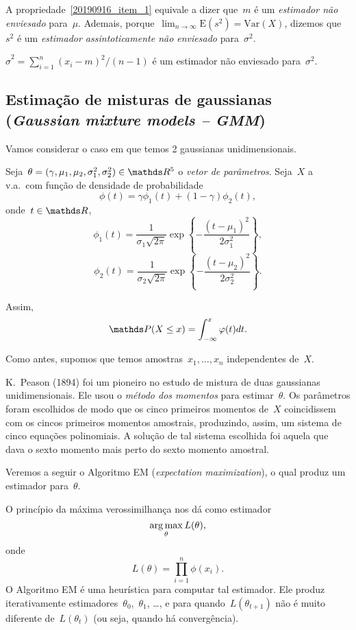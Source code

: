   A propriedade~\ref{20190916_item_1} equivale a dizer que~$m$ é um \emph{estimador não enviesado} para~$\mu$.
  Ademais, porque~$\lim_{n \to \infty}{\mathrm{E}(s^2)}
  =\mathrm{Var}(X)$, dizemos que~$s^2$ é um
  \emph{estimador assintoticamente não enviesado} para~$\sigma^2$.
  
  \begin{observacao}
   $\hat{\sigma}^2
   =\sum_{i=1}^{n}(x_i - m)^2/(n-1)$ é um estimador não enviesado
   para~$\sigma^2$.
  \end{observacao}
  
\subsection{Estimação de misturas de gaussianas
(\emph{Gaussian mixture models -- GMM})}

 Vamos considerar o caso em que temos 2 gaussianas unidimensionais.
 
 Seja~$\theta = (\gamma, \mu_1, \mu_2, \sigma^2_1, \sigma^2_2) \in \RR^5$
 o \emph{vetor de parâmetros}.
 Seja~$X$ a v.a.\ com função de densidade de probabilidade
 $$\phi(t) = \gamma \phi_1(t) + (1-\gamma) \phi_2(t),$$
 onde~$t \in \RR$,
 $$\phi_1(t) = \frac{1}{\sigma_1\sqrt{2\pi}}
 \exp\left\{ -\frac{(t-\mu_1)^2}{2\sigma_1^2} \right\},$$
 $$\phi_2(t) = \frac{1}{\sigma_2\sqrt{2\pi}}
 \exp\left\{ -\frac{(t-\mu_2)^2}{2\sigma_2^2} \right\}.$$
 
 Assim,
 $$\PP(X \le x) = \int_{-\infty}^{x}\phi(t) dt.$$
 
 Como antes, supomos que temos amostras~$x_1,\dots,x_n$
 independentes de~$X$.
 
 K.\ Peason (1894) foi um pioneiro no estudo de mistura de duas gaussianas
 unidimensionais. Ele usou o \emph{método dos momentos} para estimar~$\theta$.
 Os parâmetros foram escolhidos de modo que os cinco primeiros momentos de~$X$
 coincidissem com os cincos primeiros momentos amostrais, produzindo, assim,
 um sistema de cinco equações polinomiais. A solução de tal sistema escolhida
 foi aquela que dava o sexto momento mais perto do sexto momento amostral.
 
 Veremos a seguir o Algoritmo EM (\emph{expectation maximization}),
 o qual produz um estimador para~$\theta$.
 
 O princípio da máxima verossimilhança
 nos dá como estimador
 $$\operatorname*{arg\,max}_{\theta}{L(\theta)},$$
 onde
 $$L(\theta) = \prod_{i=1}^{n}{\phi(x_i)}.$$
 O Algoritmo EM é uma heurística para computar tal estimador.
 Ele produz iterativamente estimadores~$\theta_0$,~$\theta_1$, \dots,
 e para quando~$L(\theta_{t+1})$ não é muito diferente de~$L(\theta_{t})$
 (ou seja, quando há convergência).
 
